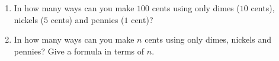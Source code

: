 \begin{enumerate}
\item[(a)] In how many ways can you make $100$ cents using only dimes ($10$ cents), nickels ($5$ cents) and pennies ($1$ cent)?
\item[(b)] In how many ways can you make $n$ cents using only dimes, nickels and pennies? Give a formula in terms of $n$.
\end{enumerate}
